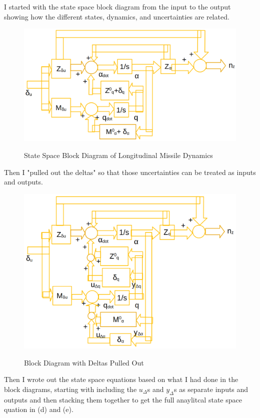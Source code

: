 \documentclass{article}
\begin{document}
I started with the state space block diagram from the input to the output showing how the different states, dynamics, and uncertainties are related.

\begin{figure}[H]
    \centering
    \includegraphics[width=\textwidth]{2blockDiagram.png}
    \label{fig:2blockDiagram}
    \caption{State Space Block Diagram of Longitudinal Missile Dynamics}
\end{figure}

Then I "pulled out the deltas" so that those uncertainties can be treated as inputs and outputs.

\begin{figure}[H]
    \centering
    \includegraphics[width=\textwidth]{2blockDeltaPulled.png}
    \label{fig:2blockDeltaPulled}
    \caption{Block Diagram with Deltas Pulled Out}
\end{figure}

Then I wrote out the state space equations based on what I had done in the block diagrams, starting with including the $u_\Delta$s and $y_\Delta$s as separate inputs and outputs and then stacking them together to get the full anaylitcal state space quation in (d) and (e).
\end{document}
